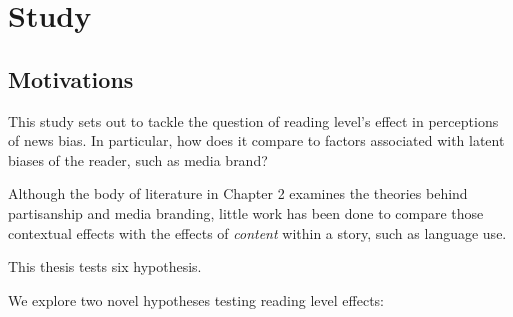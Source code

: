 \chapter{Study}

\section{Motivations}
 
 





 
This study sets out to tackle the question of reading level's effect in perceptions of news bias. In particular, how does it compare to factors associated with latent biases of the reader, such as media brand?

Although the body of literature in Chapter 2 examines the theories behind partisanship and media branding, little work has been done to compare those contextual effects with the effects of \emph{content} within a story, such as language use.

This thesis tests six hypothesis.

We explore two novel hypotheses testing reading level effects:

